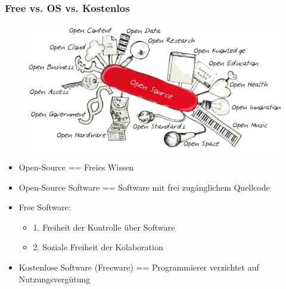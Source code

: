 


\begin{frame}
\frametitle{Free vs. OS vs. Kostenlos}
\begin{figure}
\includegraphics[scale=0.5]{resources/open_swiss_knife.png}
\end{figure}
\begin{itemize}
	\item Open-Source == Freies Wissen
	\item Open-Source Software == Software mit frei zugänglichem Quellcode
	\item Free Software:
	\begin{itemize}
		\item 1. Freiheit der Kontrolle über Software
		\item 2. Soziale Freiheit der Kolaboration
	\end{itemize}
	\item Kostenlose Software (Freeware) == Programmierer verzichtet auf Nutzungsvergütung
\end{itemize}

\end{frame}

